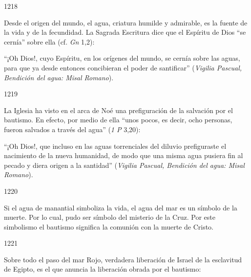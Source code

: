 			\begin{ccebody}\begin{ccenumber}1218\end{ccenumber} Desde el origen del mundo, el agua, criatura humilde y admirable, es la fuente de la vida y de la fecundidad. La Sagrada Escritura dice que el Espíritu de Dios “se cernía” sobre ella (cf. \textit{Gn} 1,2):\end{ccebody}
			
			\begin{ccecite}“¡Oh Dios!, cuyo Espíritu, en los orígenes del mundo, se cernía sobre las aguas, para que ya desde entonces concibieran el poder de santificar” (\textit{Vigilia Pascual, Bendición del agua: Misal Romano}).\end{ccecite}
			
			\begin{ccebody}\begin{ccenumber}1219\end{ccenumber} La Iglesia ha visto en el arca de Noé una prefiguración de la salvación por el bautismo. En efecto, por medio de ella “unos pocos, es decir, ocho personas, fueron salvados a través del agua” (\textit{1 P} 3,20):\end{ccebody}
			
			\begin{ccecite}“¡Oh Dios!, que incluso en las aguas torrenciales del diluvio prefiguraste el nacimiento de la nueva humanidad, de modo que una misma agua pusiera fin al pecado y diera origen a la santidad” (\textit{Vigilia Pascual, Bendición del agua: Misal Romano}).\end{ccecite}
			
			\begin{ccebody}\begin{ccenumber}1220\end{ccenumber} Si el agua de manantial simboliza la vida, el agua del mar es un símbolo de la muerte. Por lo cual, pudo ser símbolo del misterio de la Cruz. Por este simbolismo el bautismo significa la comunión con la muerte de Cristo.\end{ccebody}
			
			\begin{ccebody}\begin{ccenumber}1221\end{ccenumber} Sobre todo el paso del mar Rojo, verdadera liberación de Israel de la esclavitud de Egipto, es el que anuncia la liberación obrada por el bautismo:\end{ccebody}
			
